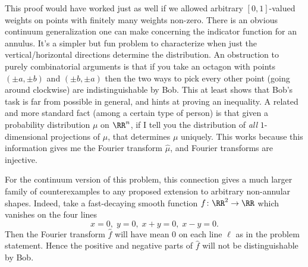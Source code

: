 \begin{remark*}
  \begin{itemize}
  \ii This proof would have worked just as well if we
  allowed arbitrary $[0,1]$-valued weights on points
  with finitely many weights non-zero.
  There is an obvious continuum generalization one
  can make concerning the indicator function for an annulus.
  It's a simpler but fun problem to characterize
  when just the vertical/horizontal directions determine the distribution.
  \ii An obstruction to purely combinatorial arguments
  is that if you take an octagon with points $(\pm a,\pm b)$
  and $(\pm b,\pm a)$ then the two ways to pick every other point
  (going around clockwise) are indistinguishable by Bob.
  This at least shows that Bob's task is far from possible in general,
  and hints at proving an inequality.
  \ii A related and more standard fact
  (among a certain type of person)
  is that given a probability distribution $\mu$ on $\RR^n$,
  if I tell you the distribution of \emph{all} $1$-dimensional
  projections of $\mu$, that determines $\mu$ uniquely.
  This works because this information gives me the Fourier transform $\hat{\mu}$,
  and Fourier transforms are injective.

  For the continuum version of this problem,
  this connection gives a much larger family of counterexamples
  to any proposed extension to arbitrary non-annular shapes.
  Indeed, take a fast-decaying smooth function
  $f \colon \RR^2 \to \RR$ which vanishes on the four lines
  \[ x=0, \; y=0, \; x+y=0, \; x-y=0.\]
  Then the Fourier transform $\hat f$ will have mean $0$
  on each line $\ell$ as in the problem statement.
  Hence the positive and negative parts of $\hat f$
  will not be distinguishable by Bob.
  \end{itemize}
\end{remark*}
